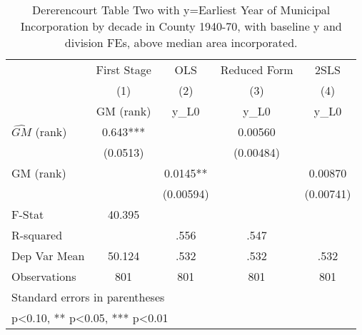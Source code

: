 \begin{table}[htbp]\centering
\def\sym#1{\ifmmode^{#1}\else\(^{#1}\)\fi}
\caption{Dererencourt Table Two with y=Earliest Year of Municipal Incorporation by decade in County 1940-70, with baseline y and division FEs, above median area incorporated.}
\begin{tabular}{l*{4}{c}}
\toprule
                    & First Stage   &         OLS   &Reduced Form   &        2SLS   \\
                    &\multicolumn{1}{c}{(1)}&\multicolumn{1}{c}{(2)}&\multicolumn{1}{c}{(3)}&\multicolumn{1}{c}{(4)}\\
                    &\multicolumn{1}{c}{GM  (rank)}&\multicolumn{1}{c}{y\_L0}&\multicolumn{1}{c}{y\_L0}&\multicolumn{1}{c}{y\_L0}\\
\midrule
$\hat{GM}$ (rank)   &       0.643***&               &     0.00560   &               \\
                    &    (0.0513)   &               &   (0.00484)   &               \\
\addlinespace
GM  (rank)          &               &      0.0145** &               &     0.00870   \\
                    &               &   (0.00594)   &               &   (0.00741)   \\
\midrule
F-Stat              &      40.395   &               &               &               \\
R-squared           &               &        .556   &        .547   &               \\
Dep Var Mean        &      50.124   &        .532   &        .532   &        .532   \\
Observations        &         801   &         801   &         801   &         801   \\
\bottomrule
\multicolumn{5}{l}{\footnotesize Standard errors in parentheses}\\
\multicolumn{5}{l}{\footnotesize * p<0.10, ** p<0.05, *** p<0.01}\\
\end{tabular}
\end{table}
